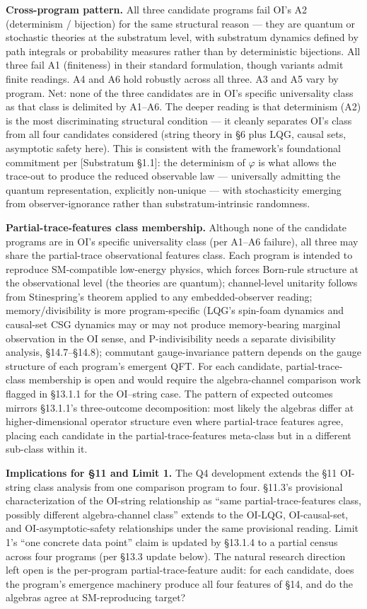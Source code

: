 \documentclass[
]{article}
\begin{document}
\textbf{Cross-program pattern.} All three candidate programs fail OI's
A2 (determinism / bijection) for the same structural reason --- they are
quantum or stochastic theories at the substratum level, with substratum
dynamics defined by path integrals or probability measures rather than
by deterministic bijections. All three fail A1 (finiteness) in their
standard formulation, though variants admit finite readings. A4 and A6
hold robustly across all three. A3 and A5 vary by program. Net: none of
the three candidates are in OI's specific universality class as that
class is delimited by A1--A6. The deeper reading is that determinism
(A2) is the most discriminating structural condition --- it cleanly
separates OI's class from all four candidates considered (string theory
in §6 plus LQG, causal sets, asymptotic safety here). This is consistent
with the framework's foundational commitment per {[}Substratum §1.1{]}:
the determinism of \(\varphi\) is what allows the trace-out to produce
the reduced observable law --- universally admitting the quantum
representation, explicitly non-unique --- with stochasticity emerging
from observer-ignorance rather than substratum-intrinsic randomness.

\textbf{Partial-trace-features class membership.} Although none of the
candidate programs are in OI's specific universality class (per A1--A6
failure), all three may share the partial-trace observational features
class. Each program is intended to reproduce SM-compatible low-energy
physics, which forces Born-rule structure at the observational level
(the theories are quantum); channel-level unitarity follows from
Stinespring's theorem applied to any embedded-observer reading;
memory/divisibility is more program-specific (LQG's spin-foam dynamics
and causal-set CSG dynamics may or may not produce memory-bearing
marginal observation in the OI sense, and P-indivisibility needs a
separate divisibility analysis, §14.7--§14.8); commutant
gauge-invariance pattern depends on the gauge structure of each
program's emergent QFT. For each candidate, partial-trace-class
membership is open and would require the algebra-channel comparison work
flagged in §13.1.1 for the OI--string case. The pattern of expected
outcomes mirrors §13.1.1's three-outcome decomposition: most likely the
algebras differ at higher-dimensional operator structure even where
partial-trace features agree, placing each candidate in the
partial-trace-features meta-class but in a different sub-class within
it.

\textbf{Implications for §11 and Limit 1.} The Q4 development extends
the §11 OI-string class analysis from one comparison program to four.
§11.3's provisional characterization of the OI-string relationship as
``same partial-trace-features class, possibly different algebra-channel
class'' extends to the OI-LQG, OI-causal-set, and OI-asymptotic-safety
relationships under the same provisional reading. Limit 1's ``one
concrete data point'' claim is updated by §13.1.4 to a partial census
across four programs (per §13.3 update below). The natural research
direction left open is the per-program partial-trace-feature audit: for
each candidate, does the program's emergence machinery produce all four
features of §14, and do the algebras agree at SM-reproducing target?
\end{document}
